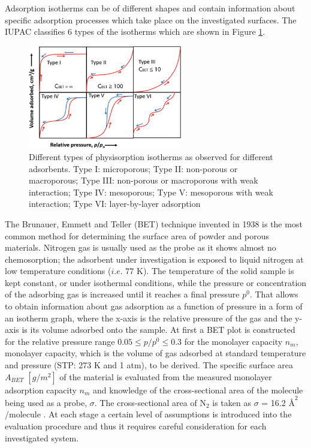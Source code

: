 Adsorption isotherms can be of different shapes and contain information about specific adsorption processes which take place on the investigated surfaces. The IUPAC classifies 6 types of the isotherms which are shown in Figure \ref{fig:isotherms_types}. 

\begin{figure}[H]
\centering
\includegraphics[width=0.6\textwidth]{Figures/Theory/isotherms_types.jpg}
\medskip
\caption{Different types of physisorption isotherms as observed for different adsorbents. Type I: microporous; Type II: non-porous or macroporous; Type III: non-porous or macroporous with weak interaction; Type IV: mesoporous; Type V: mesoporous with weak interaction; Type VI: layer-by-layer adsorption \cite{Kumar}}
\label{fig:isotherms_types}
\end{figure}

The Brunauer, Emmett and Teller (BET) technique invented in 1938 is the most common method for determining the surface area of powder and porous materials.  Nitrogen gas is usually used as the probe as it shows almost no chemosorption; the adsorbent under investigation is exposed to liquid nitrogen at low temperature conditions ($i.e.$ 77 K). The temperature of the solid sample is kept constant, or under isothermal conditions, while the pressure or concentration of the adsorbing gas is increased until it reaches a final pressure \(p^0\).
That allows to obtain information about gas adsorption as a function of pressure in a form of an isotherm graph, where the x-axis is the relative pressure of the gas and the y-axis is its volume adsorbed onto the sample. At first a BET plot is constructed for the relative pressure range \(0.05 \le p/p^0 \le 0.3\) for the monolayer capacity $n_m$, monolayer capacity, which is the volume of gas adsorbed at standard temperature and pressure (STP: 273 K and 1 atm), to be derived. The specific surface area $A_{BET}$ $[g/m^2]$ of the material is evaluated from the measured monolayer adsorption capacity $n_m$ and knowledge of the cross-sectional area of the molecule being used as a probe, $\sigma$. The cross-sectional area of N$_2$ is taken as $\sigma$ =  16.2 $\si{\angstrom}^2$/molecule \cite{Kumar}. 
At each stage a certain level of assumptions is introduced into the evaluation procedure and thus it requires careful consideration for each investigated system.

